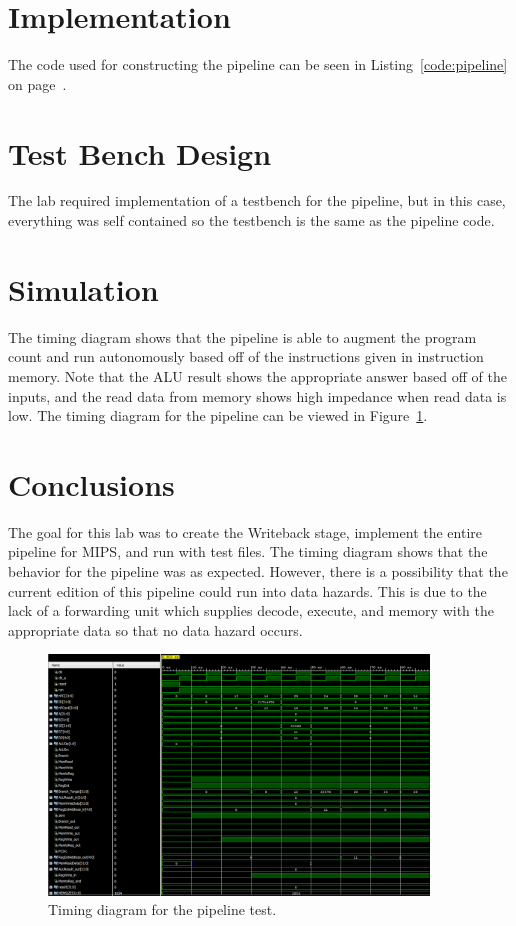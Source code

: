 \documentclass{article}
\newcommand{\Verilog}[3]{
  \lstset{language=Verilog}
  \lstset{backgroundcolor=\color{listinggray},rulecolor=\color{blue}}
  \lstset{linewidth=\textwidth}
  \lstset{commentstyle=\textit, stringstyle=\upshape,showspaces=false}
  \lstset{frame=tb}
  
}
\begin{document}
\section{Implementation}
The code used for constructing the pipeline can be seen in Listing~\ref{code:pipeline} on page~\pageref{code:pipeline}.

\Verilog{Verilog code for constructing the pipeline.}{code:pipeline}{../code/pipeline.v}

\section{Test Bench Design}
The lab required implementation of a testbench for the pipeline, but in this case, everything was self contained so the testbench is the same as the pipeline code.

\section{Simulation}
The timing diagram shows that the pipeline is able to augment the program count and run autonomously based off of the instructions given in instruction memory. Note that the ALU result shows the appropriate answer based off of the inputs, and the read data from memory shows high impedance when read data is low. The timing diagram for the pipeline can be viewed in Figure~\ref{fig:test}. 
\section{Conclusions}
The goal for this lab was to create the Writeback stage, implement the entire pipeline for MIPS, and run with test files. The timing diagram shows that the behavior for the pipeline was as expected. However, there is a possibility that the current edition of this pipeline could run into data hazards. This is due to the lack of a forwarding unit which supplies decode, execute, and memory with the appropriate data so that no data hazard occurs.
\begin{figure}
	\begin{center}
		\caption{Timing diagram for the pipeline test.}\label{fig:test}
		\includegraphics[width=0.9\textwidth]{../images/PIPELINEPIC.png}
	\end{center}
\end{figure}
\end{document}
